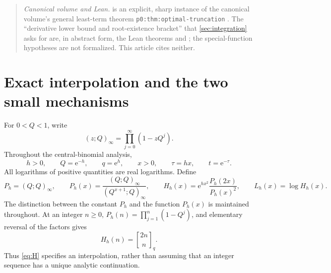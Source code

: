 \documentclass[11pt,a4paper]{article}
\newcommand{\ee}{\mathrm e}
\newcommand{\qpoch}[2]{(#1;#2)_\infty}
\numberwithin{equation}{section}
\theoremstyle{plain}
\theoremstyle{definition}
\theoremstyle{remark}
\begin{document}
\begin{quote}
\emph{Canonical volume and Lean.}  is an explicit, sharp
instance of the canonical volume's general least-term theorem
\texttt{p0:thm:optimal-truncation} \cite{ed:tai}. The ``derivative lower
bound and root-existence bracket'' that \cref{sec:integration} asks for are,
in abstract form, the Lean theorems
 and 
\cite{ed:lean}; the special-function hypotheses are not formalized. This
article cites neither.
\end{quote}

\section{Exact interpolation and the two small mechanisms}
\label{sec:model}

For $0<Q<1$, write
\[
 \qpoch{z}{Q}=\prod_{j=0}^{\infty}(1-zQ^j).
\]
Throughout the central-binomial analysis,
\begin{equation}
 h>0,\qquad Q=\ee^{-h},\qquad q=\ee^h,\qquad x>0,
 \qquad \tau=hx,\qquad t=\ee^{-\tau}.
 \label{eq:parameters}
\end{equation}
All logarithms of positive quantities are real logarithms. Define
\begin{equation}
 P_h=\qpoch{Q}{Q},\qquad
 P_h(x)=\frac{\qpoch{Q}{Q}}{\qpoch{Q^{x+1}}{Q}},\qquad
 H_h(x)=\ee^{hx^2}\frac{P_h(2x)}{P_h(x)^2},\qquad
 L_h(x)=\log H_h(x).
 \label{eq:H}
\end{equation}
The distinction between the constant $P_h$ and the function $P_h(x)$ is
maintained throughout. At an integer $n\ge0$, $P_h(n)=\prod_{j=1}^n(1-Q^j)$,
and elementary reversal of the factors gives
\[
 H_h(n)=\genfrac{[}{]}{0pt}{}{2n}{n}_{q}.
\]
Thus \eqref{eq:H} specifies an interpolation, rather than assuming that an
integer sequence has a unique analytic continuation.
\end{document}
